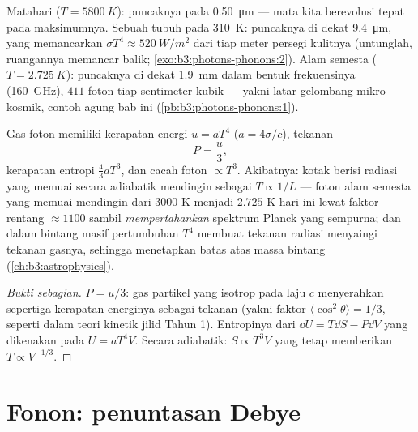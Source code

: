 \begin{example}\label{ex:b3:photons-phonons:thermometers}
Matahari ($T = \qty{5800}{K}$): puncaknya pada \qty{0.50}{\micro m} ---
mata kita berevolusi tepat pada maksimumnya. Sebuah tubuh pada \qty{310}{K}:
puncaknya di dekat \qty{9.4}{\micro m}, yang memancarkan $\sigma T^4 \approx
\qty{520}{W/m^2}$ dari tiap meter persegi kulitnya (untunglah,
ruangannya memancar balik;
\cref{exo:b3:photons-phonons:2}). Alam semesta ($T =
\qty{2.725}{K}$): puncaknya di dekat \qty{1.9}{mm} dalam bentuk
frekuensinya (\qty{160}{GHz}), $411$ foton tiap sentimeter kubik ---
yakni latar gelombang mikro kosmik, contoh agung bab ini
(\cref{pb:b3:photons-phonons:1}).
\end{example}

\begin{proposition}\label{prop:b3:photons-phonons:thermo}
Gas foton memiliki kerapatan energi $u = aT^4$ ($a =
4\sigma/c$), tekanan
\[
P = \frac u3 ,
\]
kerapatan entropi $\tfrac43 aT^3$, dan cacah foton $\propto T^3$.
Akibatnya: kotak berisi radiasi yang memuai secara adiabatik
mendingin sebagai $T \propto 1/L$ --- foton alam semesta yang memuai
mendingin dari $3000$ K menjadi $2.725$ K hari ini lewat faktor rentang
$\approx1100$ sambil \emph{mempertahankan} spektrum Planck yang
sempurna; dan dalam bintang masif pertumbuhan $T^4$ membuat tekanan
radiasi menyaingi tekanan gasnya, sehingga menetapkan batas atas massa
bintang (\cref{ch:b3:astrophysics}).
\end{proposition}

\begin{proof}[Bukti sebagian]
$P = u/3$: gas partikel yang isotrop pada laju $c$ menyerahkan
sepertiga kerapatan energinya sebagai tekanan (yakni faktor $\langle
\cos^2\theta\rangle = 1/3$, seperti dalam teori kinetik jilid Tahun 1).
Entropinya dari $\dd U = T\dd S - P\dd V$ yang dikenakan pada $U =
aT^4V$. Secara adiabatik: $S \propto T^3V$ yang tetap memberikan $T \propto
V^{-1/3}$.
\end{proof}

\section{Fonon: penuntasan Debye}

